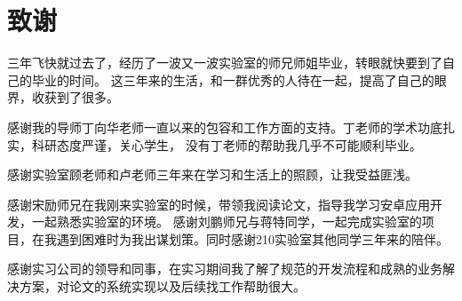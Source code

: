 \chapter{致谢}

三年飞快就过去了，经历了一波又一波实验室的师兄师姐毕业，转眼就快要到了自己的毕业的时间。 这三年来的生活，和一群优秀的人待在一起，提高了自己的眼界，收获到了很多。

感谢我的导师丁向华老师一直以来的包容和工作方面的支持。丁老师的学术功底扎实，科研态度严谨，关心学生， 没有丁老师的帮助我几乎不可能顺利毕业。

感谢实验室顾老师和卢老师三年来在学习和生活上的照顾，让我受益匪浅。

感谢宋励师兄在我刚来实验室的时候，带领我阅读论文，指导我学习安卓应用开发，一起熟悉实验室的环境。 
感谢刘鹏师兄与蒋特同学，一起完成实验室的项目，在我遇到困难时为我出谋划策。同时感谢210实验室其他同学三年来的陪伴。

感谢实习公司的领导和同事，在实习期间我了解了规范的开发流程和成熟的业务解决方案，对论文的系统实现以及后续找工作帮助很大。